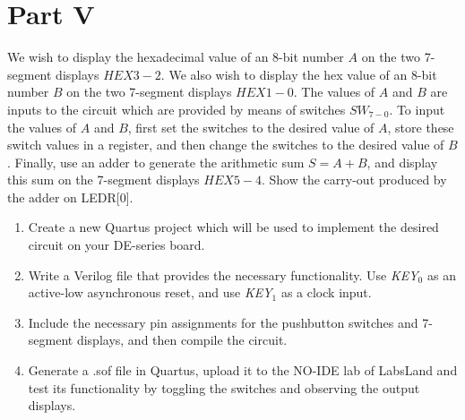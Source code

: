 \documentclass[epsfig,10pt,fullpage]{article}
\newcommand{\CommonDocsPath}{../../../common/docs}
\begin{document}
\section*{Part V}
We wish to display the hexadecimal value of an 8-bit number $A$
on the two 7-segment displays $HEX3-2$.  We also wish to display the
hex value of an 8-bit number $B$ on the two 7-segment displays $HEX1-0$. 
The values of $A$ and $B$ are inputs to the circuit which are
provided by means of switches $SW_{7-0}$.  To input the values of $A$ and $B$, 
first set the switches to the desired value of $A$, store these switch values in a register, 
and then change the switches to the desired value of $B$.  Finally, use an adder to 
generate the arithmetic sum $S = A + B$, and display this sum on the 7-segment 
displays $HEX5-4$. Show the carry-out produced by the adder on LEDR[0].
\begin{enumerate}
\item Create a new Quartus project which will be used to implement the desired
circuit on your DE-series board.
\item Write a Verilog file that provides the necessary functionality. Use {\it KEY}$_0$ as
an active-low asynchronous reset, and use {\it KEY}$_1$ as a clock input.
\item Include the necessary pin assignments for the pushbutton switches and 7-segment
displays, and then compile the circuit.
\item Generate a .sof file in Quartus, upload it to the NO-IDE lab of LabsLand and test its functionality 
by toggling the switches and observing the output displays.
\end{enumerate}




\end{document}

